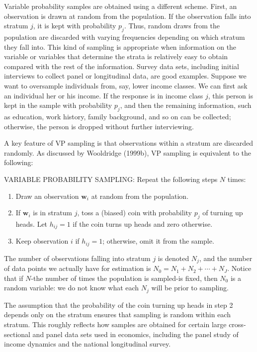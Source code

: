 \documentclass[10pt]{article}
\begin{document}
Variable probability samples are obtained using a different scheme. First, an observation is drawn at random from the population. If the observation falls into stratum $j$, it is kept with probability $p_{j}$. Thus, random draws from the population are discarded with varying frequencies depending on which stratum they fall into. This kind of sampling is appropriate when information on the variable or variables that determine the strata is relatively easy to obtain compared with the rest of the information. Survey data sets, including initial interviews to collect panel or longitudinal data, are good examples. Suppose we want to oversample individuals from, say, lower income classes. We can first ask an individual her or his income. If the response is in income class $j$, this person is kept in the sample with probability $p_{j}$, and then the remaining information, such as education, work history, family background, and so on can be collected; otherwise, the person is dropped without further interviewing.

A key feature of VP sampling is that observations within a stratum are discarded randomly. As discussed by Wooldridge (1999b), VP sampling is equivalent to the following:

VARIABLE PROBABILITY SAMPLING: Repeat the following steps $N$ times:

\begin{enumerate}
  \item Draw an observation $\mathbf{w}_{i}$ at random from the population.
  \item If $\mathbf{w}_{i}$ is in stratum $j$, toss a (biased) coin with probability $p_{j}$ of turning up heads. Let $h_{i j}=1$ if the coin turns up heads and zero otherwise.
  \item Keep observation $i$ if $h_{i j}=1$; otherwise, omit it from the sample.
\end{enumerate}

The number of observations falling into stratum $j$ is denoted $N_{j}$, and the number of data points we actually have for estimation is $N_{0}=N_{1}+N_{2}+\cdots+N_{J}$. Notice that if $N$-the number of times the population is sampled-is fixed, then $N_{0}$ is a random variable: we do not know what each $N_{j}$ will be prior to sampling.

The assumption that the probability of the coin turning up heads in step 2 depends only on the stratum ensures that sampling is random within each stratum. This roughly reflects how samples are obtained for certain large cross-sectional and panel data sets used in economics, including the panel study of income dynamics and the national longitudinal survey.
\end{document}
